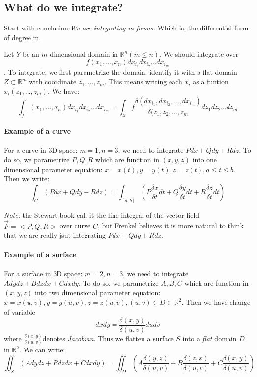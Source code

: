 \documentclass[11pt, oneside]{article}   	%
\begin{document}
\subsection{What do we integrate?}
Start with conclusion:\emph{We are integrating m-forms.}
Which is, the differential form of degree m. 
\par
Let $Y$ be an $m$ dimensional domain in $\mathbb{R}^n (m\leq n)$. We should integrate over $$f(x_1, \ldots, x_n)dx_{i_1}dx_{i_2}\ldots dx_{i_m}$$. To integrate, we first parametrize the domain: identify it with a flat domain $Z\subset \mathbb{R}^m$ with coordinate $z_1, \ldots, z_m$. This means writing each $x_i$ as a funtion $x_i(z_1,\ldots,z_m)$. We have:
$$\int_f(x_1, \ldots, x_n)dx_{i_1}dx_{i_2}\ldots dx_{i_m} = \int_Z f\frac{\delta(dx_{i_1},dx_{i_2},\ldots ,dx_{i_m})}{\delta(z_1, z_2, \ldots, z_m}dz_1 dz_2\ldots dz_m$$

\paragraph{Example of a curve}
For a curve in 3D space: $m = 1, n = 3$, we need to integrate $Pdx + Qdy + Rdz$. To do so, we parametrize $P,Q,R$ which are function in $(x,y,z)$ into one dimensional parameter equation: $x=x(t), y=y(t),z=z(t), a\leq t \leq b$. Then we write: $$\int_C (Pdx+Qdy+Rdz) = \int_{[a,b]} (P\frac{\delta x}{\delta t} dt + Q\frac{\delta y}{\delta t} dt + R\frac{\delta z}{\delta t} dt)$$
\par
\emph{Note:} the Stewart book call it the line integral of the vector field $\vec{F} = <P,Q,R>$ over curve $C$, but Frenkel believes it is more natural to think that we are really jsut integrating $Pdx+Qdy+Rdz$.

\paragraph{Example of a surface}
For a surface in 3D space: $m = 2, n = 3$, we need to integrate $Adydz + Bdzdx + Cdxdy$. To do so, we parametrize $A,B,C$ which are function in $(x,y,z)$ into two dimensional parameter equation: $x = x(u,v), y=y(u,v),z=z(u,v), (u,v)\in D \subset \mathbb{R}^2$. Then we have change of variable $$dxdy = \frac{\delta(x,y)}{\delta(u,v)} dudv$$ where $\frac{\delta(x,y)}{\delta(u,v)} $denotes \emph{Jacobian}. Thus we flatten a surface $S$ into a \emph{flat} domain $D$ in $\mathbb{R}^2$. We can write: 
$$ \iint_S (Adydz + Bdzdx + Cdxdy) = \iint_D (A\frac{\delta(y,z)}{\delta(u,v)}+B\frac{\delta(z,x)}{\delta(u,v)}+C\frac{\delta(x,y)}{\delta(u,v)})$$
\end{document}
